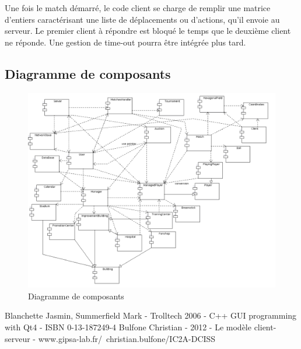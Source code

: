 \documentclass[a4paper,titlepage]{scrreprt}
\begin{document}
  Une fois le match démarré, le code client se charge de remplir une matrice d'entiers caractérisant
  une liste de déplacements ou d'actions, qu'il envoie au serveur. Le premier client à répondre
  est bloqué le temps que le deuxième client ne réponde. 
  Une gestion de time-out pourra être intégrée plus tard.

\subsection{Diagramme de composants}
      \begin{figure}[H]
    \center
    \includegraphics[scale=0.4]{uml/Diagrammededeploiement.png}
    \caption{Diagramme de composants}
    \end{figure}
\begin{thebibliography}{9}
 Blanchette Jasmin, Summerfield Mark - Trolltech 2006 - C++ GUI programming with Qt4 - ISBN 0-13-187249-4
 Bulfone Christian - 2012 - Le modèle client-serveur - www.gipsa-lab.fr/~christian.bulfone/IC2A-DCISS
\end{thebibliography}
\printindex
\end{document}
